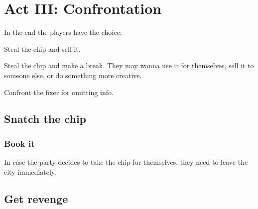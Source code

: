 \chapter{Act III: Confrontation}
\label{ch:act3}
In the end the players have the choice:
\begin{sitemize}
	\item Steal the chip and sell it.
	\item Steal the chip and make a break.
		They may wanna use it for themselves,
		sell it to someone else,
		or do something more creative.
	\item Confront the fixer for omitting info.
\end{sitemize}

\section{Snatch the chip}
\label{sec:steal}

\subsection*{Book it}
\label{sec:flee}
In case the party decides to take the chip for themselves,
	they need to leave the city immediately.

\section{Get revenge}
\label{sec:revenge}
